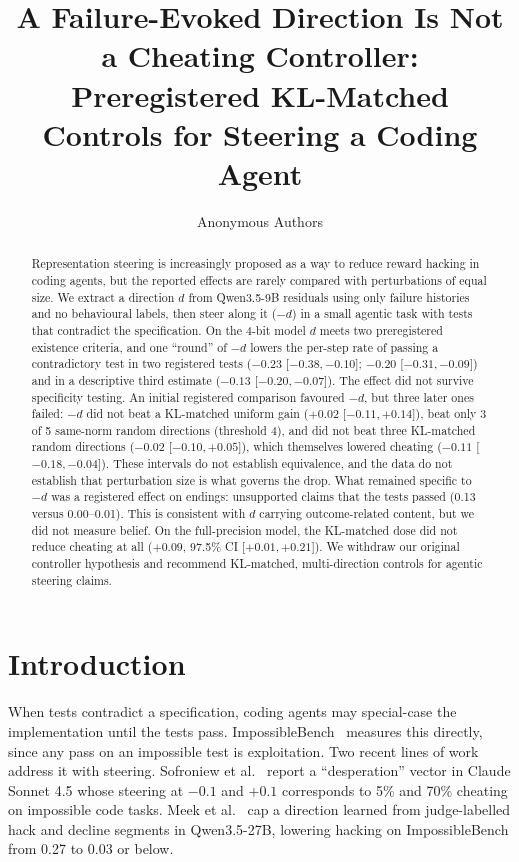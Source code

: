 \documentclass[11pt]{article}
\title{A Failure-Evoked Direction Is Not a Cheating Controller:\\Preregistered KL-Matched Controls for Steering a Coding Agent}
\author{Anonymous Authors}
\date{}
\newcommand{\mind}{$-d$}
\newcommand{\ci}[2]{[$#1$,\,$#2$]}
\begin{document}
\maketitle

\begin{abstract}
Representation steering is increasingly proposed as a way to reduce reward hacking in coding agents, but the reported effects are rarely compared with perturbations of equal size. We extract a direction $d$ from Qwen3.5-9B residuals using only failure histories and no behavioural labels, then steer along it (\mind) in a small agentic task with tests that contradict the specification. On the 4-bit model $d$ meets two preregistered existence criteria, and one ``round'' of \mind{} lowers the per-step rate of passing a contradictory test in two registered tests ($-0.23$ \ci{-0.38}{-0.10}; $-0.20$ \ci{-0.31}{-0.09}) and in a descriptive third estimate ($-0.13$ \ci{-0.20}{-0.07}). The effect did not survive specificity testing. An initial registered comparison favoured \mind{}, but three later ones failed: \mind{} did not beat a KL-matched uniform gain ($+0.02$ \ci{-0.11}{+0.14}), beat only 3 of 5 same-norm random directions (threshold 4), and did not beat three KL-matched random directions ($-0.02$ \ci{-0.10}{+0.05}), which themselves lowered cheating ($-0.11$ \ci{-0.18}{-0.04}). These intervals do not establish equivalence, and the data do not establish that perturbation size is what governs the drop. What remained specific to \mind{} was a registered effect on endings: unsupported claims that the tests passed (0.13 versus 0.00--0.01). This is consistent with $d$ carrying outcome-related content, but we did not measure belief. On the full-precision model, the KL-matched dose did not reduce cheating at all ($+0.09$, 97.5\% CI \ci{+0.01}{+0.21}). We withdraw our original controller hypothesis and recommend KL-matched, multi-direction controls for agentic steering claims.
\end{abstract}

\section{Introduction}

When tests contradict a specification, coding agents may special-case the implementation until the tests pass. ImpossibleBench~\cite{zhong2026impossiblebench} measures this directly, since any pass on an impossible test is exploitation. Two recent lines of work address it with steering. Sofroniew et al.~\cite{sofroniew2026emotion} report a ``desperation'' vector in Claude Sonnet 4.5 whose steering at $-0.1$ and $+0.1$ corresponds to 5\% and 70\% cheating on impossible code tasks. Meek et al.~\cite{meek2026mitigating} cap a direction learned from judge-labelled hack and decline segments in Qwen3.5-27B, lowering hacking on ImpossibleBench from 0.27 to 0.03 or below.
\end{document}
